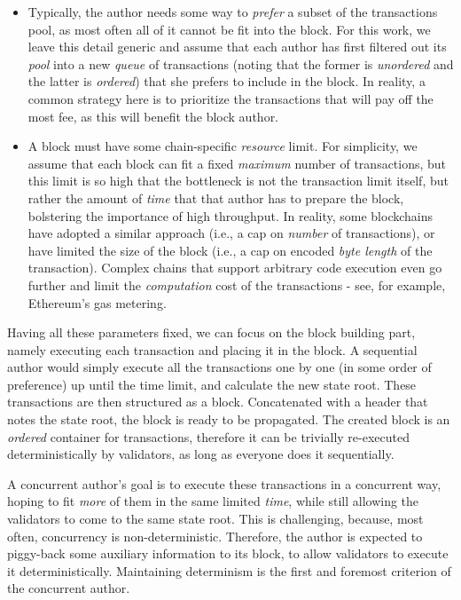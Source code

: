 \begin{itemize}
	\item Typically, the author needs some way to \textit{prefer} a subset of the transactions pool,
	as most often all of it cannot be fit into the block. For this work, we leave this detail
	generic and assume that each author has first filtered out its \textit{pool} into a new
	\textit{queue} of transactions (noting that the former is \textit{unordered} and the latter is
	\textit{ordered}) that she prefers to include in the block. In reality, a common strategy here
	is to prioritize the transactions that will pay off the most fee, as this will benefit the block
	author.
	\item A block must have some chain-specific \textit{resource} limit. For simplicity, we assume
	that each block can fit a fixed \textit{maximum} number of transactions, but this limit is so
	high that the bottleneck is not the transaction limit itself, but rather the amount of
	\textit{time} that that author has to prepare the block, bolstering the importance of high
	throughput. In reality, some blockchains have adopted a similar approach (i.e., a cap on
	\textit{number} of transactions), or have limited the size of the block (i.e., a cap on encoded
	\textit{byte length} of the transaction). Complex chains that support arbitrary code execution
	even go further and limit the \textit{computation} cost of the transactions - see, for example,
	Ethereum's gas metering\cite{perezBrokenMetreAttacking2020}.
\end{itemize}

Having all these parameters fixed, we can focus on the block building part, namely executing
each transaction and placing it in the block. A sequential author would simply execute all the
transactions one by one (in some order of preference) up until the time limit, and calculate the new
state root. These transactions are then structured as a block. Concatenated with a header that notes
the state root, the block is ready to be propagated. The created block is an \textit{ordered}
container for transactions, therefore it can be trivially re-executed deterministically by
validators, as long as everyone does it sequentially.

A concurrent author's goal is to execute these transactions in a concurrent way, hoping to fit
\textit{more} of them in the same limited \textit{time}, while still allowing the validators to come
to the same state root. This is challenging, because, most often, concurrency is non-deterministic.
Therefore, the author is expected to piggy-back some auxiliary information to its block, to allow
validators to execute it deterministically. Maintaining determinism is the first and foremost
criterion of the concurrent author.

